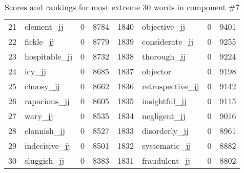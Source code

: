 \begin{table}[tbp]
\begin{tabular}{| rlr@{.}l | rlr@{.}l |}
    21 & clement\_jj & 0 & 8784    &    1840 & objective\_jj & 0 & 9401 \\
    22 & fickle\_jj & 0 & 8779    &    1839 & considerate\_jj & 0 & 9255 \\
    23 & hospitable\_jj & 0 & 8732    &    1838 & thorough\_jj & 0 & 9224 \\
    24 & icy\_jj & 0 & 8685    &    1837 & objector & 0 & 9198 \\
    25 & choosy\_jj & 0 & 8662    &    1836 & retrospective\_jj & 0 & 9142 \\
    26 & rapacious\_jj & 0 & 8605    &    1835 & insightful\_jj & 0 & 9115 \\
    27 & wary\_jj & 0 & 8535    &    1834 & negligent\_jj & 0 & 9016 \\
    28 & clannish\_jj & 0 & 8527    &    1833 & disorderly\_jj & 0 & 8961 \\
    29 & indecisive\_jj & 0 & 8501    &    1832 & systematic\_jj & 0 & 8882 \\
    30 & sluggish\_jj & 0 & 8383    &    1831 & fraudulent\_jj & 0 & 8802 \\
    \hline
    \end{tabular}
    \caption{Scores and rankings for most extreme 30 words in component \#7} 
\end{table}
\clearpage
